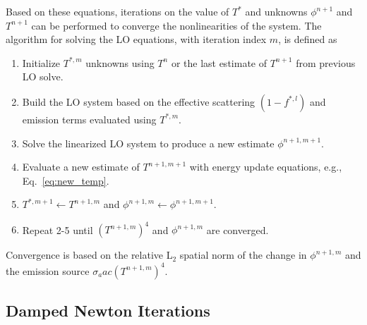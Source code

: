 Based on these equations, iterations on the value of $T^*$ and unknowns $\phi^{n+1}$ and $T^{n+1}$ can be performed to converge the nonlinearities of the system. The algorithm for solving the LO equations, with iteration index
$m$, is defined as
\begin{enumerate}
    \item Initialize $T^{*,m}$ unknowns using $T^n$ or the last estimate of $T^{n+1}$ from
        previous LO solve.
    \item  Build the LO system based on the effective scattering $(1-f^{*,l})$ and emission terms
        evaluated using $T^{*,m}$.
    \item Solve the linearized LO system to produce a new estimate $\phi^{n+1,m+1}$.
    \item Evaluate a new estimate of $T^{n+1,m+1}$ with energy update equations, e.g., Eq.~\eqref{eq:new_temp}.
       \item $T^{*,m+1}\leftarrow{T}^{n+1,m}$ and $\phi^{n+1,m} \leftarrow
           \phi^{n+1,m+1}$.
    \item Repeat 2-5 until $(T^{n+1,m})^4$ and $\phi^{n+1,m}$ are converged.
\end{enumerate}
Convergence is based on the relative L$_2$ spatial norm of the change in $\phi^{n+1,m}$
and the emission source $\sigma_a a c \left(T^{n+1,m}\right)^4$.

\subsection{Damped Newton Iterations}
\label{app:damped_newton}

